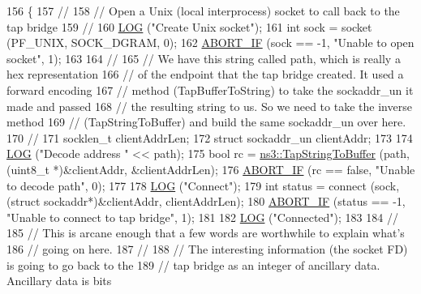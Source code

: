 \begin{DoxyCode}
156 \{
157   \textcolor{comment}{//}
158   \textcolor{comment}{// Open a Unix (local interprocess) socket to call back to the tap bridge}
159   \textcolor{comment}{//}
160   \hyperlink{tap-creator_8cc_a158a8c64f24645c7478298399825737f}{LOG} (\textcolor{stringliteral}{"Create Unix socket"});
161   \textcolor{keywordtype}{int} sock = socket (PF\_UNIX, SOCK\_DGRAM, 0);
162   \hyperlink{tap-creator_8cc_a91c11c90ad2f1672fbd3c031038dce16}{ABORT\_IF} (sock == -1, \textcolor{stringliteral}{"Unable to open socket"}, 1);
163 
164   \textcolor{comment}{//}
165   \textcolor{comment}{// We have this string called path, which is really a hex representation}
166   \textcolor{comment}{// of the endpoint that the tap bridge created.  It used a forward encoding}
167   \textcolor{comment}{// method (TapBufferToString) to take the sockaddr\_un it made and passed }
168   \textcolor{comment}{// the resulting string to us.  So we need to take the inverse method}
169   \textcolor{comment}{// (TapStringToBuffer) and build the same sockaddr\_un over here.}
170   \textcolor{comment}{//}
171   socklen\_t clientAddrLen;
172   \textcolor{keyword}{struct }sockaddr\_un clientAddr;
173 
174   \hyperlink{tap-creator_8cc_a158a8c64f24645c7478298399825737f}{LOG} (\textcolor{stringliteral}{"Decode address "} << path);
175   \textcolor{keywordtype}{bool} rc = \hyperlink{namespacens3_aac751b6756ef1eb455958b985b357b6d}{ns3::TapStringToBuffer} (path, (uint8\_t *)&clientAddr, &clientAddrLen);
176   \hyperlink{tap-creator_8cc_a91c11c90ad2f1672fbd3c031038dce16}{ABORT\_IF} (rc == \textcolor{keyword}{false}, \textcolor{stringliteral}{"Unable to decode path"}, 0);
177 
178   \hyperlink{tap-creator_8cc_a158a8c64f24645c7478298399825737f}{LOG} (\textcolor{stringliteral}{"Connect"});
179   \textcolor{keywordtype}{int} status = connect (sock, (\textcolor{keyword}{struct} sockaddr*)&clientAddr, clientAddrLen);
180   \hyperlink{tap-creator_8cc_a91c11c90ad2f1672fbd3c031038dce16}{ABORT\_IF} (status == -1, \textcolor{stringliteral}{"Unable to connect to tap bridge"}, 1);
181 
182   \hyperlink{tap-creator_8cc_a158a8c64f24645c7478298399825737f}{LOG} (\textcolor{stringliteral}{"Connected"});
183 
184   \textcolor{comment}{//}
185   \textcolor{comment}{// This is arcane enough that a few words are worthwhile to explain what's }
186   \textcolor{comment}{// going on here.}
187   \textcolor{comment}{//}
188   \textcolor{comment}{// The interesting information (the socket FD) is going to go back to the}
189   \textcolor{comment}{// tap bridge as an integer of ancillary data.  Ancillary data is bits }

\end{DoxyCode}
